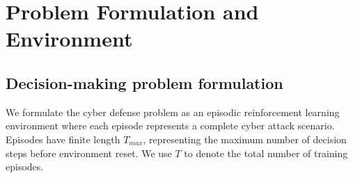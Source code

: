 \documentclass[12pt,oneside]{article}
\begin{document}



\tableofcontents
\clearpage  %

\begin{abstract}

\vspace{1em} %

Modern cybersecurity defense faces an asymmetric challenge: sophisticated adversaries adapt tactics faster than traditional rule-based systems can respond. We formulate cyber defense as a multi-agent reinforcement learning problem where defensive agents learn adaptive deception strategies through adversarial interaction. Using Proximal Policy Optimization, our approach trains agents to strategically deploy honeypots and decoy systems that mislead attackers while protecting critical assets. The key insight is that learned adaptive placement creates strategic uncertainty for attackers, disrupting reconnaissance and lateral movement phases. We validate this approach through comprehensive evaluation against traditional baselines across diverse network configurations, integrating real MITRE ATT\&CK commands to ensure behavioral fidelity. Results demonstrate that PPO-based defensive strategies achieve superior performance compared to static and rule-based approaches while maintaining the consistency and reliability required for enterprise deployment.
\end{abstract}

\clearpage
\section{Problem Formulation and Environment}

\subsection{Decision-making problem formulation}

We formulate the cyber defense problem as an episodic reinforcement learning environment where each episode represents a complete cyber attack scenario. Episodes have finite length $T_{max}$, representing the maximum number of decision steps before environment reset. We use $T$ to denote the total number of training episodes.
\end{document}
